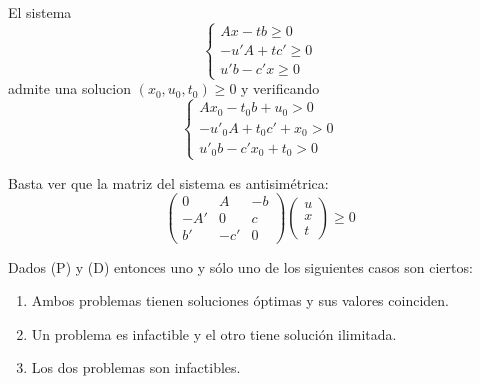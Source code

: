 \documentclass[PM.tex]{subfiles}
\begin{document}
\begin{lema}
El sistema
\begin{equation*}\label{sistema1}\begin{cases}
	Ax - tb ≥ 0\\
	-u'A + tc' ≥ 0\\
	u'b - c'x ≥ 0
\end{cases}\end{equation*}
admite una solucion $(x_0,u_0,t_0) ≥ 0$ y verificando
\begin{equation*}\label{sistema2}\begin{cases}
	Ax_0 - t_0b +u_0     > 0\\
	-u'_0A + t_0c' + x_0  > 0\\
	u'_0b - c'x_0 + t_0 > 0
\end{cases}\end{equation*}
\end{lema}

\begin{dem}
Basta ver que la matriz del sistema es antisimétrica:
\[ \begin{pmatrix}
	0  &  A  & -b\\
	-A' &  0  & c\\
	b'& -c'  & 0 
\end{pmatrix}\begin{pmatrix}
	u\\x\\t
\end{pmatrix} ≥ 0 \]
\end{dem}

\begin{theorem}
Dados (P) y (D) entonces uno y sólo uno de los siguientes casos son ciertos:
\begin{enumerate}
	\item Ambos problemas tienen soluciones óptimas y sus valores coinciden.
	\item Un problema es infactible y el otro tiene solución ilimitada.
	\item Los dos problemas son infactibles.
\end{enumerate}
\end{theorem}
\end{document}
